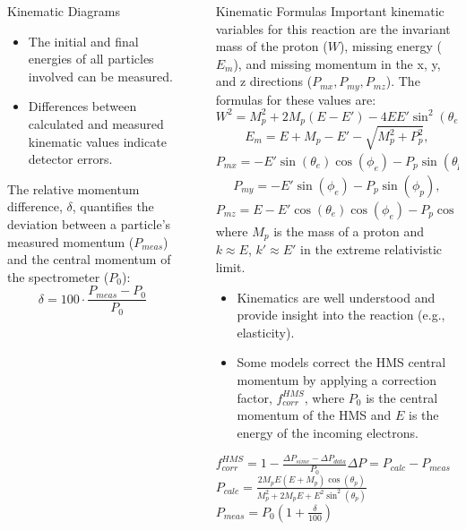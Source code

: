 \documentclass[final]{beamer}
\newlength{\sepwidth}
\newlength{\colwidth}
\newcommand{\separatorcolumn}{\begin{column}{\sepwidth}\end{column}}
\begin{document}
\begin{frame}[t]
\begin{columns}[t]
\begin{column}{\colwidth}
\begin{block}{Kinematic Diagrams}
\begin{itemize}
    \item The initial and final energies of all particles involved can be measured.
    \item Differences between calculated and measured kinematic values indicate detector errors.
    \end{itemize}
\vspace{-.5cm}
The relative momentum difference, $\delta$, quantifies the deviation between a particle's measured momentum ($P_{meas}$) and the central momentum of the spectrometer ($P_0$): $$\delta=100\cdot \frac{P_{meas}-P_0}{P_0}$$

\end{block}

\end{column}

\separatorcolumn

\begin{column}{\colwidth}
\vspace{-0.5cm}
\begin{block}{Kinematic Formulas}
Important kinematic variables for this reaction are the invariant mass of the proton ($W$), missing energy ($E_m$), and missing momentum in the x, y, and z directions ($P_{mx},P_{my},P_{mz}$). The formulas for these values are:
    $$W^2=M_p^2+2M_p(E-E')-4EE'\sin^2(\theta_e/2),$$
    $$E_m=E+M_p-E'-\sqrt{M_p^2+P_p^2},$$
    $$P_{mx}=-E'\sin(\theta_e)\cos(\phi_e)-P_p\sin(\theta_p)\cos(\phi_p),$$
    $$P_{my}=-E'\sin(\phi_e)-P_p\sin(\phi_p),$$
    $$P_{mz}=E-E'\cos(\theta_e)\cos(\phi_e)-P_p\cos(\theta_p)\cos(\phi_p),$$
    where $M_p$ is the mass of a proton and $k\approx E$, $k'\approx E'$ in the extreme relativistic limit.
\vspace{-.5cm}
\begin{itemize}
    \item Kinematics are well understood and provide insight into the reaction (e.g., elasticity).
\end{itemize}
\vspace{-.5cm}
\vspace{-.5cm}
    \begin{itemize}
        \item Some models correct the HMS central momentum by applying a correction factor, $f_{corr}^{HMS}$, where $P_0$ is the central momentum of the HMS and $E$ is the energy of the incoming electrons.
    \end{itemize}
    \centering
    $f_{corr}^{HMS}=1-\frac{\Delta P_{simc}-\Delta P_{data}}{P_0}$\hspace{3cm}$\Delta P=P_{calc}-P_{meas}$ \\ \vspace{.25cm}
    $P_{calc}=\frac{2M_pE(E+M_p)\cos(\theta_p)}{M_p^2+2M_pE+E^2\sin^2(\theta_p)}$\hspace{3cm}$P_{meas}=P_0(1+\frac{\delta}{100})$


\end{block}
\end{column}
\end{columns}
\end{frame}
\end{document}
